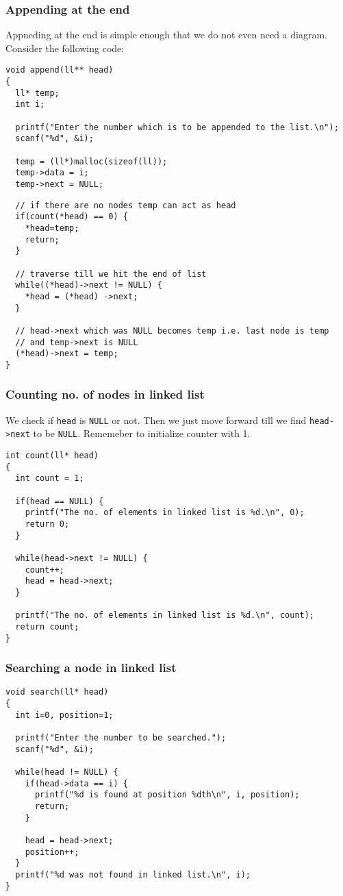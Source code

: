 \documentclass[aspectratio=1610]{beamer}
\begin{document}
\begin{frame}[fragile]
\frametitle{Appending at the end}
Appneding at the end is simple enough that we do not even need a diagram.
Consider the following code:
\begin{verbatim}
void append(ll** head)
{
  ll* temp;
  int i;

  printf("Enter the number which is to be appended to the list.\n");
  scanf("%d", &i);

  temp = (ll*)malloc(sizeof(ll));
  temp->data = i;
  temp->next = NULL;

\end{verbatim}
\end{frame}
\begin{frame}[fragile]
\begin{verbatim}
  // if there are no nodes temp can act as head
  if(count(*head) == 0) {
    *head=temp;
    return;
  }
  
  // traverse till we hit the end of list
  while((*head)->next != NULL) {
    *head = (*head) ->next;
  }

  // head->next which was NULL becomes temp i.e. last node is temp
  // and temp->next is NULL
  (*head)->next = temp;
}
\end{verbatim}
\end{frame}

\begin{frame}[fragile]
\frametitle{Counting no. of nodes in linked list}
We check if \texttt{head} is \texttt{NULL} or not. Then we just move forward
till we find \texttt{head->next} to be \texttt{NULL}. Rememeber to initialize
counter with 1.
\begin{verbatim}
int count(ll* head)
{
  int count = 1;

  if(head == NULL) {
    printf("The no. of elements in linked list is %d.\n", 0);
    return 0;
  }

  while(head->next != NULL) {
    count++;
    head = head->next;
  }

  printf("The no. of elements in linked list is %d.\n", count);
  return count;
}
\end{verbatim}
\end{frame}

\begin{frame}[fragile]
\frametitle{Searching a node in linked list}
\begin{verbatim}
void search(ll* head)
{
  int i=0, position=1;

  printf("Enter the number to be searched.");
  scanf("%d", &i);

  while(head != NULL) {
    if(head->data == i) {
      printf("%d is found at position %dth\n", i, position);
      return;
    }

    head = head->next;
    position++;
  }
  printf("%d was not found in linked list.\n", i);
}
\end{verbatim}
\end{frame}
\end{document}
